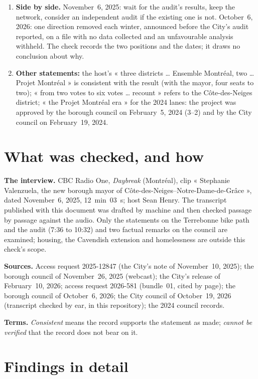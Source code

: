 \documentclass[11pt,letterpaper]{article}
\begin{document}
\begin{enumerate}[nosep]
\item \textbf{Side by side.} November~6, 2025: wait for the audit's results, keep the network, consider an independent audit if the existing one is not. October~6, 2026: one direction removed each winter, announced before the City's audit reported, on a file with no data collected and an unfavourable analysis withheld. The check records the two positions and the dates; it draws no conclusion about why.
\item \textbf{Other statements:} the host's « three districts … Ensemble Montréal, two … Projet Montréal » is consistent with the result (with the mayor, four seats to two); « from two votes to six votes … recount » refers to the Côte-des-Neiges district; « the Projet Montréal era » for the 2024 lanes: the project was approved by the borough council on February~5, 2024 (3--2) and by the City council on February~19, 2024.
\end{enumerate}

\section{What was checked, and how}

\textbf{The interview.} CBC Radio One, \emph{Daybreak} (Montréal), clip
« Stephanie Valenzuela, the new borough mayor of
Côte-des-Neiges--Notre-Dame-de-Grâce », dated November~6, 2025, 12~min~03~s;
host Sean Henry. The transcript published with this document was drafted by
machine and then checked passage by passage against the audio. Only the
statements on the Terrebonne bike path and the audit (7:36 to 10:32) and two
factual remarks on the council are examined; housing, the Cavendish
extension and homelessness are outside this check's scope.

\textbf{Sources.} Access request 2025-12847 (the City's note of November~10,
2025); the borough council of November~26, 2025 (webcast); the City's release
of February~10, 2026; access request 2026-581 (bundle~01, cited by page); the
borough council of October~6, 2026; the City council of October~19, 2026
(transcript checked by ear, in this repository); the 2024 council records.

\textbf{Terms.} \emph{Consistent} means the record supports the statement as
made; \emph{cannot be verified} that the record does not bear on it.

\section{Findings in detail}
\end{document}

